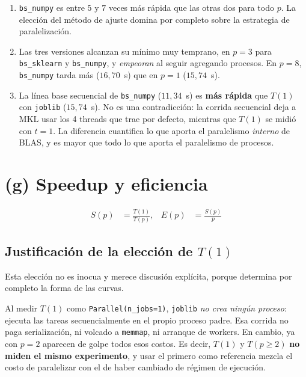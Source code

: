 \documentclass[11pt,letterpaper]{article}
\begin{document}
\begin{enumerate}
\item \texttt{bs\_numpy} es entre $5$ y $7$ veces más rápida que las otras dos para todo
  $p$. La elección del método de ajuste domina por completo sobre la estrategia de
  paralelización.
\item Las tres versiones alcanzan su mínimo muy temprano, en $p = 3$ para
  \texttt{bs\_sklearn} y \texttt{bs\_numpy}, y \emph{empeoran} al seguir agregando
  procesos. En $p = 8$, \texttt{bs\_numpy} tarda más ($16{,}70$~s) que en $p = 1$
  ($15{,}74$~s).
\item La línea base secuencial de \texttt{bs\_numpy} ($11{,}34$~s) es \textbf{más rápida}
  que $T(1)$ con \texttt{joblib} ($15{,}74$~s). No es una contradicción: la corrida
  secuencial deja a MKL usar los 4 threads que trae por defecto, mientras que $T(1)$ se
  midió con $t = 1$. La diferencia cuantifica lo que aporta el paralelismo \emph{interno}
  de BLAS, y es mayor que todo lo que aporta el paralelismo de procesos.
\end{enumerate}

\section{(g) Speedup y eficiencia}
\label{sec:g}

\begin{align}
S(p) &= \frac{T(1)}{T(p)}, &
E(p) &= \frac{S(p)}{p}
\end{align}

\subsection{Justificación de la elección de $T(1)$}

Esta elección no es inocua y merece discusión explícita, porque determina por completo la
forma de las curvas.

Al medir $T(1)$ como \texttt{Parallel(n\_jobs=1)}, \texttt{joblib} \emph{no crea ningún
proceso}: ejecuta las tareas secuencialmente en el propio proceso padre. Esa corrida no
paga serialización, ni volcado a \texttt{memmap}, ni arranque de workers. En cambio, ya
con $p = 2$ aparecen de golpe todos esos costos. Es decir, $T(1)$ y $T(p \geq 2)$
\textbf{no miden el mismo experimento}, y usar el primero como referencia mezcla el costo
de paralelizar con el de haber cambiado de régimen de ejecución.
\end{document}
